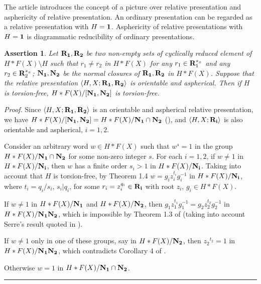 \documentclass[12pt,reqno]{amsart}
\def\edvo{\rule {6pt}{6pt}}
\newtheorem{cl}{Assertion}
\begin{document}
The article \cite{BogleyPride} introduces the concept of a picture over relative
presentation and asphericity of relative
presentation. %
An ordinary presentation can be regarded as a relative presentation with $H=\bf 1$. Asphericity of relative presentations with $H=\bf 1$ is diagrammatic reducibility of ordinary presentations.





\begin{cl}\label{relkruch2} Let
$\bf R_1, R_2$ be two non-empty sets of cyclically reduced element of $H\ast F(X)\setminus
H$ such that $r_1\neq r_2$ in $H\ast F(X)$ for any $r_1\in {\bf R}_1^{*_x}$ and any $r_2\in
{\bf R}_2^{*_x}$;
$\bf N_1,N_2$ be the normal closures of $\bf R_1, R_2$ in $H\ast F(X)$.
Suppose that the relative presentation $\langle H,X;{\bf R_1}, {\bf R_2}\rangle$ is orientable and aspherical.
Then if $H$ is torsion-free,
 $H\ast F(X)/[{\bf N_1,N_2}]$ is torsion-free.
  \end{cl}
{\it Proof.}
  Since $\langle H,X;{\bf R_1}, {\bf R_2}\rangle$ is an orientable and aspherical relative presentation, we have $H\ast F(X)/[{\bf N_1,N_2}]=H\ast F(X)/{\bf N_1}\cap {\bf N_2}$ (\cite{ok2}), and $\langle H,X;{\bf R_i}\rangle$ is also
orientable and aspherical, $i=1,2$.

 Consider an arbitrary word $w\in H\ast F(X)$ such that $w^s=1$ in the group $H\ast F(X)/{\bf N_1}\cap {\bf N_2}$ for some non-zero integer $s$. For each $i=1,2$, if $w\neq 1$ in $H\ast F(X)/{\bf N_i}$, then $w$ has a finite order $s_i>1$ in $H\ast F(X)/{\bf N_i}$. Taking into account that $H$ is torsion-free, by Theorem 1.4 \cite{BogleyPride} $w=g_iz_i^{t_i}g_i^{-1}$ in $H\ast F(X)/{\bf N_i}$, where  $t_i=q_i/s_i$, $s_i|q_i$, for some $r_i=z_i^{q_i}\in {\bf R_i}$  with root $z_i$, $g_i\in H\ast F(X)$.

  If $w\neq 1$ in $H\ast F(X)/{\bf N_1}$ and $H\ast F(X)/{\bf N_2}$, then %
  $g_1z_1^{t_1}g_1^{-1}=g_2z_2^{t_2}g_2^{-1}$  in $H\ast F(X)/{\bf N_1N_2}$, which is impossible by Theorem 1.3 of \cite{BogleyPride} (taking into account Serre's result quoted in \cite{huebschmann}).



 If $w\neq 1$ only in one of these groups, say in $H\ast F(X)/{\bf N_2}$, then ${z_2}^{t_2}=1$ in $H\ast F(X)/{\bf N_1N_2}$, which contradicts Corollary 4 of \cite{BogleyPride}.

  Otherwise $w=1$ in $H\ast F(X)/{\bf N_1}\cap {\bf N_2}$. \edvo
\end{document}
